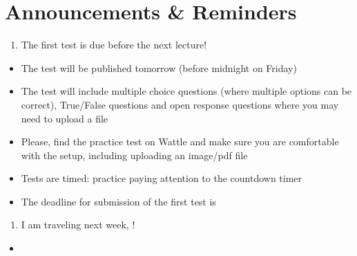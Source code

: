\documentclass[letterpaper,10pt,english]{jupyterBook}
\begin{document}
\section{Announcements \& Reminders}
\label{\detokenize{04.basic_analysis:announcements-reminders}}\begin{enumerate}
%
\item {} 
\sphinxAtStartPar
The first test is due before the next lecture!

\end{enumerate}
\begin{itemize}
\item {} 
\sphinxAtStartPar
The test will be published tomorrow (before midnight on Friday)

\item {} 
\sphinxAtStartPar
The test will include multiple choice questions (where multiple options can be correct), True/False questions and open response questions where you may need to upload a file

\item {} 
\sphinxAtStartPar
Please, find the practice test on Wattle and make sure you are comfortable with the setup, including uploading an image/pdf file

\item {} 
\sphinxAtStartPar
Tests are timed: practice paying attention to the countdown timer

\item {} 
\sphinxAtStartPar
The deadline for submission of the first test is 

\end{itemize}
\begin{enumerate}
%
\setcounter{enumi}{1}
\item {} 
\sphinxAtStartPar
I am traveling next week, !

\end{enumerate}
\begin{itemize}
\item {} 
\sphinxAtStartPar
{}

\end{itemize}
\end{document}
